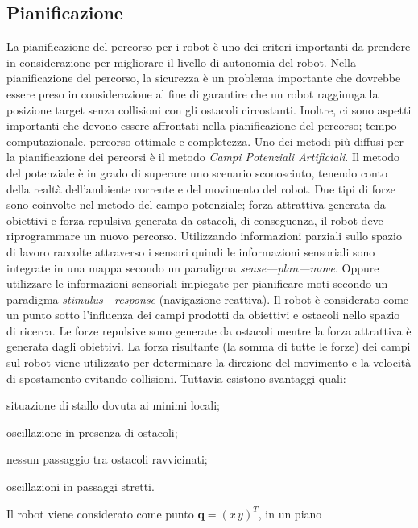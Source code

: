 \subsection{Pianificazione}
La pianificazione del percorso per i robot è uno dei criteri importanti da
prendere in considerazione per migliorare il livello di autonomia del robot.
Nella pianificazione del percorso, la sicurezza è un problema importante che 
dovrebbe essere preso in considerazione al fine di garantire che un robot 
raggiunga la posizione target senza collisioni con gli ostacoli circostanti.
Inoltre, ci sono aspetti importanti che devono essere affrontati nella 
pianificazione del percorso; tempo computazionale, percorso ottimale e 
completezza. 
Uno dei metodi più diffusi per la pianificazione dei percorsi è il metodo 
\emph{Campi Potenziali Artificiali}. 
Il metodo del potenziale è in grado di superare uno scenario sconosciuto, 
tenendo conto della realtà dell'ambiente corrente e del movimento del robot. 
Due tipi di forze sono coinvolte nel metodo del campo potenziale; forza attrattiva 
generata da obiettivi e forza repulsiva generata da ostacoli, di conseguenza, 
il robot deve riprogrammare un nuovo percorso\cite{apotetianfield}.
Utilizzando informazioni parziali sullo spazio di lavoro raccolte attraverso i 
sensori quindi le informazioni sensoriali sono integrate in una mappa secondo un 
paradigma \emph{sense---plan---move}.
Oppure utilizzare le informazioni sensoriali impiegate per pianificare moti 
secondo un paradigma \emph{stimulus---response} (navigazione reattiva).
Il robot è considerato come un punto sotto l'influenza dei campi prodotti da 
obiettivi e ostacoli nello spazio di ricerca. Le forze repulsive sono generate 
da ostacoli mentre la forza attrattiva è generata dagli obiettivi. La forza 
risultante (la somma di tutte le forze) dei campi sul robot viene utilizzato 
per determinare la direzione del movimento e la velocità di spostamento evitando 
collisioni\cite{5498220}.
Tuttavia esistono svantaggi quali:
\begin{enumerate*}[label={\alph*)},font={\bfseries}]
\item situazione di stallo dovuta ai minimi locali; 
\item oscillazione in presenza di ostacoli; 
\item nessun passaggio tra ostacoli ravvicinati; 
\item oscillazioni in passaggi stretti\cite{131810}.
\end{enumerate*}
Il robot viene considerato come punto $\mathbf{q} = (x \, y)^T$, in un piano 
